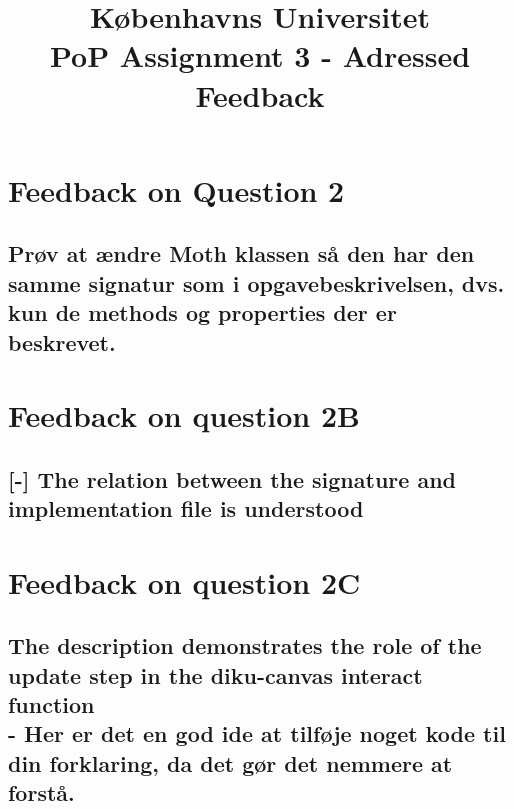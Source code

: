 \documentclass[a4paper,12pt]{article}
\begin{document}
% 

\title{Københavns Universitet\\
PoP Assignment 3 - Adressed Feedback}
\maketitle %

\section{Feedback on Question 2}

\subsection{Prøv at ændre Moth klassen så den har den samme signatur som i opgavebeskrivelsen, dvs. kun de
methods og properties der er beskrevet.}

\section{Feedback on question 2B}

\subsection{[-] The relation between the signature and implementation file is understood}

\section{Feedback on question 2C}

\subsection{The description demonstrates the role of the update step in the diku-canvas interact function\\
- Her er det en god ide at tilføje noget kode til din forklaring, da det gør det nemmere at forstå.}
\end{document}
